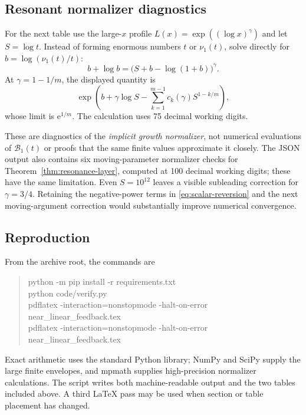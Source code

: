 \documentclass[11pt,a4paper]{article}
\numberwithin{equation}{section}
\theoremstyle{definition}
\theoremstyle{remark}
\newcommand{\Bcal}{\mathcal B}
\newcommand{\ee}{\mathrm e}
\begin{document}
\subsection{Resonant normalizer diagnostics}
For the next table use the large-$x$ profile
$L(x)=\exp((\log x)^\gamma)$ and let $S=\log t$.
Instead of forming enormous numbers $t$ or $\nu_1(t)$, solve directly for
$b=\log(\nu_1(t)/t)$:
\begin{equation}
 b+\log b=\bigl(S+b-\log(1+b)\bigr)^\gamma.
 \label{eq:numerical-b}
\end{equation}
At $\gamma=1-1/m$, the displayed quantity is
\[
 \exp\left(b+\gamma\log S-
        \sum_{k=1}^{m-1}c_k(\gamma)S^{1-k/m}\right),
\]
whose limit is $\ee^{1/m}$. The calculation uses 75 decimal working
digits.
\begin{center}
\small

\end{center}
These are diagnostics of the \emph{implicit growth normalizer}, not
numerical evaluations of $\Bcal_1(t)$ or proofs that the same finite
values approximate it closely. The JSON output also contains six
moving-parameter normalizer checks for Theorem~\ref{thm:resonance-layer},
computed at 100 decimal working digits; these have the same limitation. Even $S=10^{12}$ leaves a visible
subleading correction for $\gamma=3/4$. Retaining the negative-power
terms in \eqref{eq:scalar-reversion} and the next moving-argument
correction would substantially improve numerical convergence.

\subsection{Reproduction}
From the archive root, the commands are
\begin{quote}\ttfamily\small
python -m pip install -r requirements.txt\\
python code/verify.py\\
pdflatex -interaction=nonstopmode -halt-on-error near\_linear\_feedback.tex\\
pdflatex -interaction=nonstopmode -halt-on-error near\_linear\_feedback.tex
\end{quote}
Exact arithmetic uses the standard Python library; NumPy and SciPy
supply the large finite envelopes, and mpmath supplies high-precision
normalizer calculations. The script writes both machine-readable output
and the two tables included above. A third LaTeX pass may be used when
section or table placement has changed.
\end{document}
